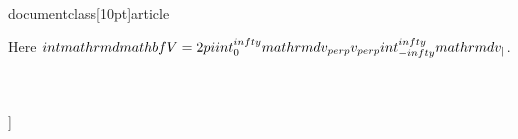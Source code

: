 \\documentclass[10pt]{article}
\begin{document}
{{{{Here $\\int \\mathrm{d} \\mathbf{V}=2 \\pi \\int_{0}^{\\infty} \\mathrm{d} v_{\\perp} v_{\\perp} \\int_{-\\infty}^{\\infty} \\mathrm{d} v_{\\|}$.

\\[
\\Pi=\\left[\\begin{array}{ccc}
\\left(\\frac{n \\Omega}{k_{\\perp}}\\right)^{2} J_{n}^{2}, & i v_{\\perp} \\frac{n \\Omega}{k_{\\perp}} J_{n} J_{n}^{\\prime}, & v_{\\|} \\frac{n \\Omega}{k_{\\perp}} J_{n}^{2}  \\tag{6.142}\\\\
-i v_{\\perp} \\frac{n \\Omega}{k_{\\perp}} J_{n} J_{n}^{\\prime}, & v_{\\perp}^{2} J_{n}^{\\prime 2}, & -i v_{\\perp} v_{\\|} J_{n} J_{n}^{\\prime} \\\\
v_{\\|} \\frac{n \\Omega}{k_{\\perp}} J_{n}^{2}, & i v_{\\perp} v_{\\|} J_{n} J_{n}^{\\prime}, & v_{\\|}^{2} J_{n}^{2}
\\end{array}\\right]
\\]

}}}}
\end{document}
